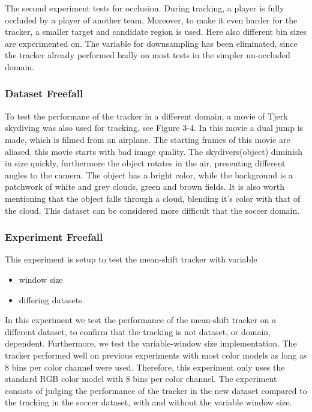 \documentclass[a4paper,11pt]{article}
\begin{document}
The second experiment tests for occlusion. During tracking, a player is fully
occluded by a player of another team. Moreover, to make it even harder for the
tracker, a smaller target and candidate region is used. Here also different bin sizes are experimented on.
The variable for downsampling has been eliminated, since the tracker already performed badly on most tests in the simpler un-occluded domain.

\subsubsection{Dataset Freefall}
To test the performane of the tracker in a different domain, a movie of Tjerk
skydiving was also used for tracking, see Figure 3-4. In this movie a dual jump is made, which is
filmed from an airplane. The starting frames of this movie are aliased, this movie starts with bad image quality.
The skydivers(object) diminish in size quickly, furthermore the object rotates in the air, presenting different angles to the camera. The object has a bright color, while the background is a patchwork of white and grey clouds, green and brown fields. It is also worth mentioning that the object falls through a cloud, blending it's color with that of the cloud.
This dataset can be considered more difficult that the soccer domain.
 

\subsubsection{Experiment Freefall}
This experiment is setup to test the mean-shift tracker with variable
\begin{itemize}
\item window size
\item differing datasets
\end{itemize}

In this experiment we test the performance of the mean-shift tracker on a different dataset, to confirm that the tracking is not dataset, or domain, dependent. Furthermore, we test the variable-window size implementation. 
The tracker performed well on previous experiments with most color models as long as 8 bins per
color channel were used. Therefore, this experiment only uses the standard RGB color model with 8 bins per color channel.
The experiment consists of judging the performance of the tracker in the new dataset compared to the tracking in the soccer dataset, with and without the variable window size.
\end{document}
